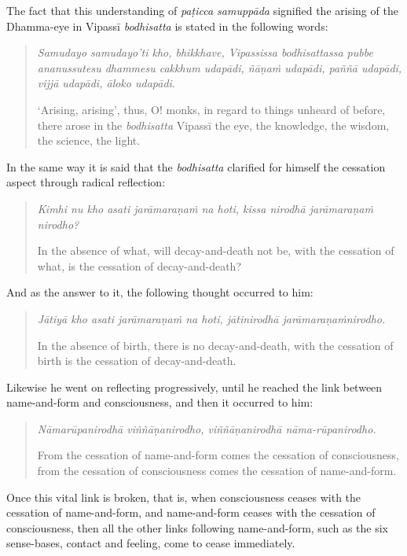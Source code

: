 The fact that this understanding of \emph{paṭicca samuppāda} signified the arising of the Dhamma-eye in Vipassī \emph{bodhisatta} is stated in the following words:

\begin{quote}
\emph{Samudayo samudayo'ti kho, bhikkhave, Vipassissa bodhisattassa pubbe ananussutesu dhammesu cakkhum udapādi, ñāṇaṁ udapādi, paññā udapādi, vijjā udapādi, āloko udapādi}.

`Arising, arising', thus, O! monks, in regard to things unheard of before, there arose in the \emph{bodhisatta} Vipassī the eye, the knowledge, the wisdom, the science, the light.
\end{quote}

In the same way it is said that the \emph{bodhisatta} clarified for himself the cessation aspect through radical reflection:

\begin{quote}
\emph{Kimhi nu kho asati jarāmaraṇaṁ na hoti, kissa nirodhā jarāmaraṇaṁ nirodho?}

In the absence of what, will decay-and-death not be, with the cessation of what, is the cessation of decay-and-death?
\end{quote}

And as the answer to it, the following thought occurred to him:

\begin{quote}
\emph{Jātiyā kho asati jarāmaraṇaṁ na hoti, jātinirodhā jarāmaraṇaṁnirodho.}

In the absence of birth, there is no decay-and-death, with the cessation of birth is the cessation of decay-and-death.
\end{quote}

Likewise he went on reflecting progressively, until he reached the link between name-and-form and consciousness, and then it occurred to him:

\begin{quote}
\emph{Nāmarūpanirodhā viññāṇanirodho, viññāṇanirodhā nāma-rūpanirodho.}

From the cessation of name-and-form comes the cessation of consciousness, from the cessation of consciousness comes the cessation of name-and-form.
\end{quote}

Once this vital link is broken, that is, when consciousness ceases with the cessation of name-and-form, and name-and-form ceases with the cessation of consciousness, then all the other links following name-and-form, such as the six sense-bases, contact and feeling, come to cease immediately.

